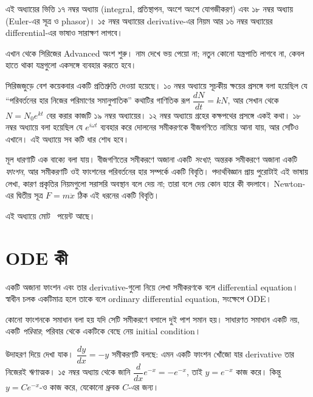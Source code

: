 \documentclass[11pt]{article}
\begin{document}

\noindent
এই অধ্যায়ের ভিত্তি ১৭ নম্বর অধ্যায় (integral, প্রতিস্থাপন, অংশে অংশে
যোগজীকরণ) এবং ১৮ নম্বর অধ্যায় (Euler-এর সূত্র ও phasor)। ১৫ নম্বর
অধ্যায়ের derivative-এর নিয়ম আর ১৬ নম্বর অধ্যায়ের differential-এর
ভাষাও সারাক্ষণ লাগবে।

এখান থেকে সিরিজের Advanced অংশ শুরু। নাম দেখে ভয় পেয়ো না; নতুন কোনো
যন্ত্রপাতি লাগবে না, কেবল হাতে থাকা যন্ত্রগুলো একসঙ্গে ব্যবহার করতে হবে।

সিরিজজুড়ে বেশ কয়েকবার একটি প্রতিশ্রুতি দেওয়া হয়েছে। ১০ নম্বর অধ্যায়ে
সূচকীয় ক্ষয়ের প্রসঙ্গে বলা হয়েছিল যে ``পরিবর্তনের হার নিজের পরিমাণের
সমানুপাতিক'' কথাটির গাণিতিক রূপ $\dfrac{dN}{dt} = kN$, আর সেখান থেকে
$N = N_{0}e^{kt}$ বের করার কাজটি ১৯ নম্বর অধ্যায়ের। ১২ নম্বর অধ্যায়ে
গ্রহের কক্ষপথের প্রসঙ্গে একই কথা। ১৮ নম্বর অধ্যায়ে বলা হয়েছিল যে
$e^{i\omega t}$ ব্যবহার করে দোলনের সমীকরণকে বীজগণিতে নামিয়ে আনা যায়, আর
সেটিও এখানে। এই অধ্যায়ে সব কটি ধার শোধ হবে।

মূল ধারণাটি এক বাক্যে বলা যায়। বীজগণিতের সমীকরণে অজানা একটি \emph{সংখ্যা};
অন্তরক সমীকরণে অজানা একটি \emph{ফাংশন}, আর সমীকরণটি ওই ফাংশনের পরিবর্তনের হার
সম্পর্কে একটি বিবৃতি। পদার্থবিজ্ঞান প্রায় পুরোটাই এই ভাষায় লেখা, কারণ
প্রকৃতির নিয়মগুলো সরাসরি অবস্থান বলে দেয় না; তারা বলে দেয় কোন হারে কী বদলাবে।
Newton-এর দ্বিতীয় সূত্র $F = m\ddot{x}$ ঠিক এই ধরনের একটি বিবৃতি।

এই অধ্যায়ে মোট \totalpoints\ পয়েন্ট আছে।

\section{ODE কী}

\begin{idea}
একটি অজানা ফাংশন এবং তার derivative-গুলো নিয়ে লেখা সমীকরণকে বলে differential
equation। স্বাধীন চলক একটিমাত্র হলে তাকে বলে ordinary differential equation,
সংক্ষেপে ODE।

কোনো ফাংশনকে সমাধান বলা হয় যদি সেটি সমীকরণে বসালে দুই পাশ সমান হয়। সাধারণত
সমাধান একটি নয়, একটি \emph{পরিবার}; পরিবার থেকে একটিকে বেছে নেয় initial
condition।
\end{idea}

উদাহরণ দিয়ে দেখা যাক। $\dfrac{dy}{dx} = -y$ সমীকরণটি বলছে: এমন একটি ফাংশন খোঁজো
যার derivative তার নিজেরই ঋণাত্মক। ১৫ নম্বর অধ্যায় থেকে জানি
$\dfrac{d}{dx}e^{-x} = -e^{-x}$, তাই $y = e^{-x}$ কাজ করে। কিন্তু
$y = Ce^{-x}$-ও কাজ করে, যেকোনো ধ্রুবক $C$-এর জন্য।
\end{document}

